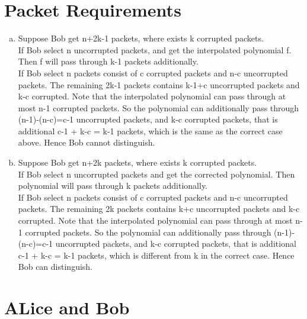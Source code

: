 \documentclass{article}
\begin{document}
\part*{Packet Requirements}
\begin{enumerate}[(a).]
    \item Suppose Bob get n+2k-1 packets, where exists k corrupted packets.\\

    If Bob select n uncorrupted packets, and get the interpolated polynomial f. 
    Then f will pass through k-1 packets additionally.\\

    If Bob select n packets consist of c corrupted packets and n-c uncorrupted packets. 
    The remaining 2k-1 packets contains k-1+c uncorrupted packets and k-c corrupted. 
    Note that the interpolated polynomial can pass through at most n-1 corrupted packets. 
    So the polynomial can additionally pass through (n-1)-(n-c)=c-1 uncorrupted packets, and k-c corrupted packets, 
    that is additional c-1 + k-c = k-1 packets, which is the same as the correct case above. 
    Hence Bob cannot distinguish.

    \item Suppose Bob get n+2k packets, where exists k corrupted packets.\\
    
    If Bob select n uncorrupted packets and get the corrected polynomial. 
    Then polynomial will pass through k packets additionally.\\

    If Bob select n packets consist of c corrupted packets and n-c uncorrupted packets. 
    The remaining 2k packets contains k+c uncorrupted packets and k-c corrupted. 
    Note that the interpolated polynomial can pass through at most n-1 corrupted packets. 
    So the polynomial can additionally pass through (n-1)-(n-c)=c-1 uncorrupted packets, and k-c corrupted packets, 
    that is additional c-1 + k-c = k-1 packets, which is different from k in the correct case. 
    Hence Bob can distinguish.

\end{enumerate}

\part*{ALice and Bob}
\end{document}
